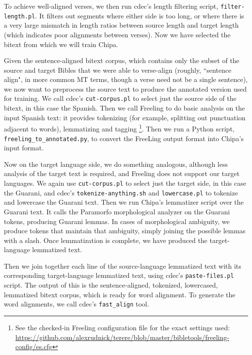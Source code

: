 To achieve well-aligned verses, we then run cdec's length filtering script,
\texttt{filter-length.pl}. It filters out segments where either side is too
long, or where there is a very large mismatch in length ratios between source
length and target length (which indicates poor alignments between verses). Now
we have selected the bitext from which we will train Chipa.


Given the sentence-aligned bitext corpus, which contains only the subset of the
source and target Bibles that we were able to verse-align (roughly, ``sentence
align", in more common MT terms, though a verse need not be a single sentence),
we now want to preprocess the source text to produce the annotated version used
for training. We call cdec's \texttt{cut-corpus.pl} to select just the source
side of the bitext, in this case the Spanish. Then we call Freeling to do basic
analysis on the input Spanish text: it provides tokenizing (for example,
splitting out punctuation adjacent to words), lemmatizing and tagging
\footnote{See the checked-in Freeling configuration file for the exact settings
used:
\url{https://github.com/alexrudnick/terere/blob/master/bibletools/freeling-config/es.cfg}}.
Then we run a Python script, \texttt{freeling\_to\_annotated.py}, to convert
the FreeLing output format into Chipa's input format.

Now on the target language side, we do something analogous, although less
analysis of the target text is required, and Freeling does not support our
target languages. We again use \texttt{cut-corpus.pl} to select just the target
side, in this case the Guarani, and cdec's \texttt{tokenize-anything.sh} and
\texttt{lowercase.pl} to tokenize and lowercase the Guarani text. Then we run
Chipa's lemmatizer script over the Guarani text. It calls the Paramorfo
morphological analyzer on the Guarani tokens, producing Guarani lemmas. In
cases of morphological ambiguity, we produce tokens that maintain that
ambiguity, simply joining the possible lemmas with a slash.  Once lemmatization
is complete, we have produced the target-language lemmatized text.

Then we join together each line of the source-language lemmatized text with its
corresponding target-language lemmatized text, using cdec's
\texttt{paste-files.pl} script. The output of this is the sentence-aligned,
tokenized, lowercased, lemmatized bitext corpus, which is ready for word
alignment. To generate the word alignments, we call cdec's \texttt{fast\_align}
tool.

